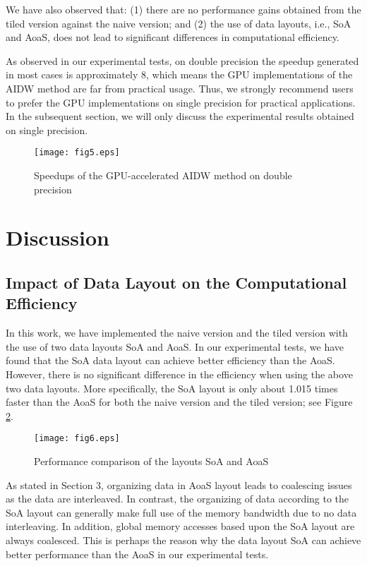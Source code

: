 \documentclass[fleqn,11pt]{wlscirep}
\begin{document}
We have also observed that: (1) there are no performance gains obtained from 
the tiled version against the naive version; and (2) the use of data 
layouts, i.e., SoA and AoaS, does not lead to significant differences in 
computational efficiency. 

As observed in our experimental tests, on double precision the speedup 
generated in most cases is approximately 8, which means the GPU 
implementations of the AIDW method are far from practical usage. Thus, we 
strongly recommend users to prefer the GPU implementations on single 
precision for practical applications. In the subsequent section, we will 
only discuss the experimental results obtained on single precision.

\begin{figure}[ht]
	\centering
	\texttt{[image: fig5.eps]}
	\caption{Speedups of the GPU-accelerated AIDW method on double precision}
	\label{fig5:speedup double}
\end{figure}

\section{Discussion}\label{sec5}
\subsection{Impact of Data Layout on the Computational Efficiency}
In this work, we have implemented the naive version and the tiled version 
with the use of two data layouts SoA and AoaS. In our experimental tests, we 
have found that the SoA data layout can achieve better efficiency than the 
AoaS. However, there is no significant difference in the efficiency when 
using the above two data layouts. More specifically, the SoA layout is only 
about 1.015 times faster than the AoaS for both the naive version and the 
tiled version; see Figure \ref{fig6:soa vs aoas}.


\begin{figure}[ht]
	\centering
	\texttt{[image: fig6.eps]}
	\caption{Performance comparison of the layouts SoA and AoaS}
	\label{fig6:soa vs aoas}
\end{figure}


As stated in Section 3, organizing data in AoaS layout leads to coalescing 
issues as the data are interleaved. In contrast, the organizing of data 
according to the SoA layout can generally make full use of the memory 
bandwidth due to no data interleaving. In addition, global memory accesses 
based upon the SoA layout are always coalesced. This is perhaps the reason 
why the data layout SoA can achieve better performance than the AoaS in our 
experimental tests.
\end{document}
